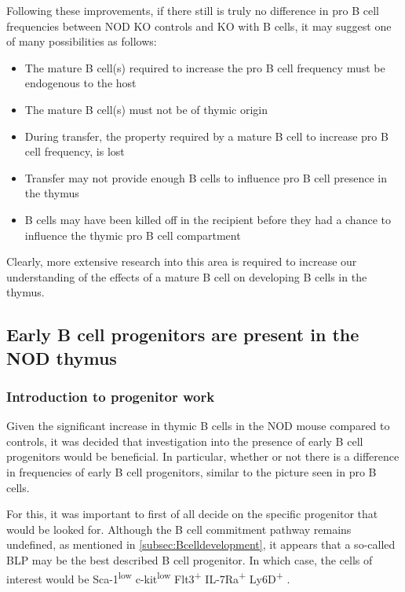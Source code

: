 Following these improvements, if there still is truly no difference in pro B cell frequencies between NOD KO controls and KO with B cells, it may suggest one of many possibilities as follows:
\begin{itemize}
\item The mature B cell(s) required to increase the pro B cell frequency must be endogenous to the host
\item The mature B cell(s) must not be of thymic origin
\item During transfer, the property required by a mature B cell to increase pro B cell frequency, is lost
\item Transfer may not provide enough B cells to influence pro B cell presence in the thymus
\item B cells may have been killed off in the recipient before they had a chance to influence the thymic pro B cell compartment
\end{itemize}

Clearly, more extensive research into this area is required to increase our understanding of the effects of a mature B cell on developing B cells in the thymus.


\subsection{Early B cell progenitors are present in the NOD thymus}

\subsubsection{Introduction to progenitor work}

Given the significant increase in thymic B cells in the NOD mouse compared to controls, it was decided that investigation into the presence of early B cell progenitors would be beneficial.
In particular, whether or not there is a difference in frequencies of early B cell progenitors, similar to the picture seen in pro B cells.

For this, it was important to first of all decide on the specific progenitor that would be looked for.
Although the B cell commitment pathway remains undefined, as mentioned in \cref{subsec:Bcelldevelopment}, it appears that a so-called BLP may be the best described B cell progenitor.
In which case, the cells of interest would be Sca-1\textsuperscript{low} c-kit\textsuperscript{low} Flt3\textsuperscript{+} IL-7Ra\textsuperscript{+} Ly6D\textsuperscript{+} \citep{Mansson2010, Inlay2009, Zhang2013}.

